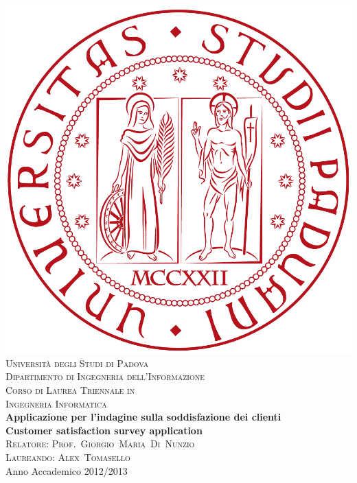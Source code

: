 



\begin{titlepage}
\begin{center}
\includegraphics[scale=0.08]{logo.png}\\[1.5cm]
\textsc{\LARGE Università degli Studi di Padova}\\[1.2cm]
\textsc{\Large Dipartimento di Ingegneria dell'Informazione}\\[0.8cm]
\textsc{\Large Corso di Laurea Triennale in}\\[0.5cm]
\textsc{\Large Ingegneria Informatica}\\[2cm]
{ \LARGE \bfseries Applicazione per l'indagine sulla soddisfazione dei
clienti}\\[1cm]
{  \bfseries Customer satisfaction survey application}\\[2cm] 
\textsc{\large Relatore: Prof.~Giorgio~Maria~Di~Nunzio}\\[0.5cm]
\textsc{\large Laureando: Alex~Tomasello}\\
\vfill
{\large Anno Accademico 2012/2013}
\end{center}
\end{titlepage}


